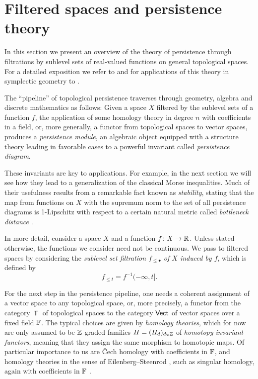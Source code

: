 
\section{Filtered spaces and persistence theory} \label{s:persistence}

In this section we present an overview of the theory of persistence through filtrations by sublevel sets of real-valued functions on general topological spaces.
For a detailed exposition we refer to \cite{Chazal.2016a, Oudot.2015, Polterovich.2020} and for applications of this theory in symplectic geometry to
\cite{Polterovich.2016, Usher.2016, LeRoux.2018, Shelukhin.2019}.

The ``pipeline'' of topological persistence traverses through geometry, algebra and discrete mathematics as follows:
Given a space $X$ filtered by the sublevel sets of a function $f$, the application of some homology theory in degree $n$ with coefficients in a field, or, more generally, a functor from topological spaces to vector spaces, produces a \emph{persistence module}, an algebraic object equipped with a structure theory leading in favorable cases to a powerful invariant called \emph{persistence diagram}.

These invariants are key to applications.
For example, in the next section we will see how they lead to a generalization of the classical Morse inequalities.
Much of their usefulness results from a remarkable fact known as \emph{stability}, stating that the map from functions on $X$ with the supremum norm to the set of all persistence diagrams is 1-Lipschitz with respect to a certain natural metric called \emph{bottleneck distance} \cite{Cohen-Steiner.2007}.

In more detail, consider a space $X$ and a function $f \colon X \to \mathbb{R}$.
Unless stated otherwise, the functions we consider need not be continuous.
We pass to filtered spaces by considering the \emph{sublevel set filtration $f_{\leq \bullet}$ of $X$ induced by $f$}, which is defined by
\begin{equation*}
f_{\leq t} = f^{-1}(-\infty, t].
\end{equation*}

For the next step in the persistence pipeline, one needs a coherent assignment of a vector space to any topological space, or, more precisely, a functor from the category $\Top$ of topological spaces to the category $\mathsf{Vect}$ of vector spaces over a fixed field $\mathbb{F}$.
The typical choices are given by \emph{homology theories}, which for now are only assumed to be $\mathbb{Z}$-graded families $H = (H_d)_{d \in \mathbb{Z}}$ of \emph{homotopy invariant functors}, meaning that they assign the same morphism to homotopic maps.
Of particular importance to us are \v{C}ech homology \cite[Section IX--X]{Eilenberg.1952} with coefficients in $\mathbb{F}$, and homology theories in the sense of Eilenberg--Steenrod \cite[Section I]{Eilenberg.1952}, such as singular homology, again with coefficients in $\mathbb{F}$ \cite{Eilenberg.1944}.

